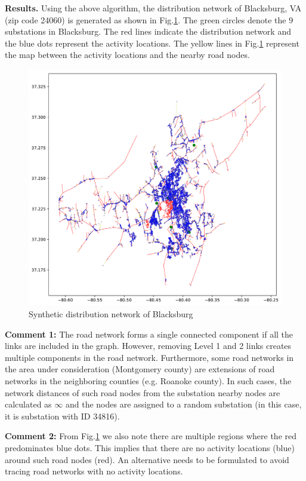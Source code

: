 \documentclass[12pt]{amsart}
\theoremstyle{definition}
\theoremstyle{remark} \newtheorem{remark}[theorem]{Remark} %
\numberwithin{equation}{section} %
\begin{document}
	\noindent
	\textbf{Results.} Using the above algorithm, the distribution network of Blacksburg, VA (zip code 24060) is generated as shown in Fig.\ref{fig:4}. The green circles denote the $9$ substations in Blacksburg. The red lines indicate the distribution network and the blue dots represent the activity locations. The yellow lines in Fig.\ref{fig:4} represent the map between the activity locations and the nearby road nodes.
	
	\begin{figure}
		\centering
		\includegraphics[scale=0.75]{figs/fig4.pdf}
		\caption{Synthetic distribution network of Blacksburg}
		\label{fig:4}
	\end{figure}
	
	\textbf{Comment 1:} The road network forms a single connected component if all the links are included in the graph. However, removing Level 1 and 2 links creates multiple components in the road network. Furthermore, some road networks in the area under consideration (Montgomery county) are extensions of road networks in the neighboring counties (e.g. Roanoke county). In such cases, the network distances of such road nodes from the substation nearby nodes are calculated as $\infty$ and the nodes are assigned to a random substation (in this case, it is substation with ID 34816).
	
	\textbf{Comment 2:} From Fig.\ref{fig:4} we also note there are multiple regions where the red predominates blue dots. This implies that there are no activity locations (blue) around such road nodes (red). An alternative needs to be formulated to avoid tracing road networks with no activity locations.
	
\end{document}

